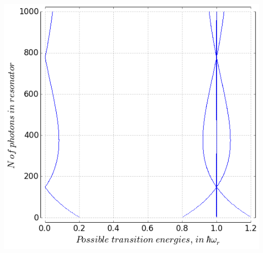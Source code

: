 \documentclass[aspectratio=169, 13pt]{beamer}
\begin{document}
\begin{frame}[c, noframenumbering]
\begin{columns}
{\centering
\includegraphics[height=0.8\textheight]{JCM_transitions}
}
\end{columns}
\end{frame}
\end{document}
